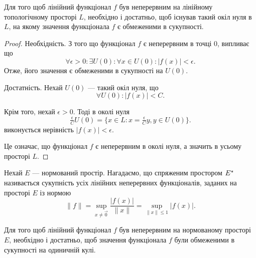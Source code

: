 \begin{theorem}
Для того щоб лінійний функціонал $f$ був
неперервним на лінійному топологічному просторі $L$,
необхідно і достатньо, щоб існував такий окіл нуля в $L$, на
якому значення функціонала $f$ є обмеженими в сукупності.
\end{theorem}

\begin{proof}
Необхідність. З того що функціонал $f$ є
неперервним в точці $0$, випливає що
\begin{equation*}
    \forall \epsilon > 0: \exists U(0): \forall x \in U(0): |f(x)| < \epsilon.
\end{equation*}
Отже, його значення є обмеженими в сукупності на $U(0)$.

Достатність. Нехай $U(0)$ --- такий окіл нуля, що
\begin{equation*}
    \forall U(0): |f(x)| < C.
\end{equation*}

Крім того, нехай $\epsilon > 0$. Тоді в околі нуля
\begin{equation*}
    \tfrac{\epsilon}{C} U(0) = \{ x \in L: x = \tfrac{\epsilon}{C} y, y \in U(0) \}.
\end{equation*}
виконується нерівність $|f(x)| < \epsilon$.

Це означає, що функціонал $f$ є неперервним в околі нуля, а
значить в усьому просторі $L$.
\end{proof}

Нехай $E$ --- нормований простір. Нагадаємо, що
спряженим простором $E^\star$ називається сукупність усіх
лінійних неперервних функціоналів, заданих на просторі $E$
із нормою
\begin{equation*}
    \|f\| = \sup_{x \ne \vec 0} \frac{|f(x)|}{\|x\|} = \sup_{\|x\| \le 1} |f(x)|.
\end{equation*}

\begin{theorem}
Для того щоб лінійний функціонал $f$ був
неперервним на нормованому просторі $E$, необхідно і
достатньо, щоб значення функціонала $f$ були обмеженими
в сукупності на одиничній кулі.
\end{theorem}

